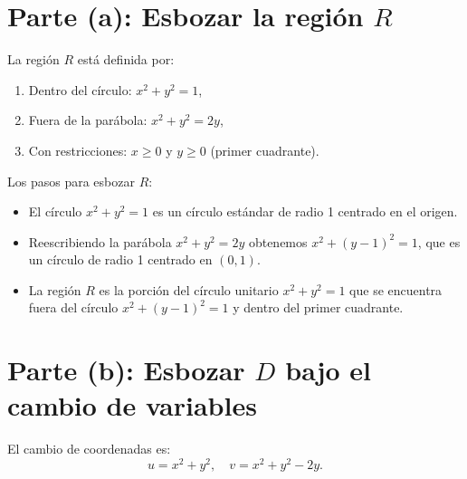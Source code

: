 \section*{Parte (a): Esbozar la región \( R \)}

La región \( R \) está definida por:
\begin{enumerate}
    \item Dentro del círculo: \( x^2 + y^2 = 1 \),
    \item Fuera de la parábola: \( x^2 + y^2 = 2y \),
    \item Con restricciones: \( x \geq 0 \) y \( y \geq 0 \) (primer cuadrante).
\end{enumerate}

Los pasos para esbozar \( R \):
\begin{itemize}
    \item El círculo \( x^2 + y^2 = 1 \) es un círculo estándar de radio 1 centrado en el origen.
    \item Reescribiendo la parábola \( x^2 + y^2 = 2y \) obtenemos \( x^2 + (y-1)^2 = 1 \), que es un círculo de radio 1 centrado en \( (0,1) \).
    \item La región \( R \) es la porción del círculo unitario \( x^2 + y^2 = 1 \) que se encuentra fuera del círculo \( x^2 + (y-1)^2 = 1 \) y dentro del primer cuadrante.
\end{itemize}

\section*{Parte (b): Esbozar \( D \) bajo el cambio de variables}

El cambio de coordenadas es:
\[
u = x^2 + y^2, \quad v = x^2 + y^2 - 2y.
\]

